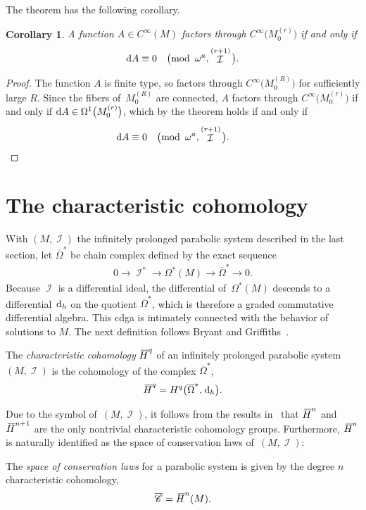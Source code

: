 \documentclass[10pt,a4paper]{amsart}
\DeclareMathOperator{\I}{\mathcal{I}}
\renewcommand{\d}{{\rm d}}
\newcommand{\cinfinity}[1]{C^\infty\big(#1\big)}
\renewcommand{\mod}[1]{\quad\big(\mathrm{mod\enspace} #1\big)}
\newcommand{\M}[1]{M_0^{(#1)}}
\renewcommand{\dh}{\ensuremath{\hspace{1pt} \d_h}}
\newcommand{\barh}[1]{{}\mkern3mu\overline{\mkern-3mu H}^{#1}}
\newcommand{\cMinfty}{C^\infty(M)}
\newcommand{\Omegabar}{\overline{\Omega}}
\numberwithin{equation}{section}
\newtheorem{Corollary}[Theorem]{Corollary}
\begin{document}
The theorem has the following corollary.
\begin{Corollary}\label{cor: factoring through}
 A function $A \in \cMinfty$ factors through $\cinfinity{\M{r}}$ if and only if
 \begin{gather*}
 \d A \equiv 0 \mod{\omega^a, \I^{(r+1)}} .
 \end{gather*}
\end{Corollary}
\begin{proof}
 The function $A$ is finite type, so factors through $\cinfinity{\M{R}}$ for sufficiently large $R$. Since the fibers of~$\M{R}$ are connected, $A$ factors through $\cinfinity{\M{r}}$ if and only if $\d A \in \Omega^1\big(\M{r}\big)$, which by the theorem holds if and only if
 \begin{gather*}
 \d A \equiv 0 \mod{\omega^a, \I^{(r+1)}} .
 \tag*{\qed}
\end{gather*}
\renewcommand{\qed}{}
\end{proof}


\section{The characteristic cohomology}\label{sec:characteristic cohomology}

With $(M, \I)$ the infinitely prolonged parabolic system described in the last section, let $\Omegabar^*$ be chain complex defined by the exact sequence
\begin{gather*}
0 \xrightarrow{\quad} \I^* \xrightarrow{\quad} \Omega^*(M) \xrightarrow{\quad} \Omegabar^* \xrightarrow{\quad} 0 .
\end{gather*}
Because $\I$ is a differential ideal, the differential of~$\Omega^*(M)$ descends to a differential $\dh$ on the quotient $\Omegabar^*$, which is therefore a graded commutative differential algebra.
This cdga is intimately connected with the behavior of solutions to $M$. The next definition follows Bryant and Griffiths~\cite{Characteristic_Cohomology_I}.
\begin{Definition}
 The \emph{characteristic cohomology} $\barh{q}$ of an infinitely prolonged parabolic sys\-tem~$(M,\I)$ is the cohomology of the complex $\Omegabar^*$,
 \begin{gather*}
 \barh{q} = H^q\big(\Omegabar^*,\dh\big) .
 \end{gather*}
\end{Definition}
Due to the symbol of~$(M,\I)$, it follows from the results in~\cite{Characteristic_Cohomology_I} that $\barh{n}$ and $\barh{n+1}$ are the only nontrivial characteristic cohomology groups. Furthermore,
$\barh{n}$ is naturally identified as the space of conservation laws of~$(M,\I)$:
\begin{Definition}
 The \emph{space of conservation laws} for a parabolic system is given by the degree $n$ characteristic cohomology,
 \begin{gather*}
 \overline{\mathscr{C}} = \barh{n}(M) .
 \end{gather*}
\end{Definition}
\end{document}
